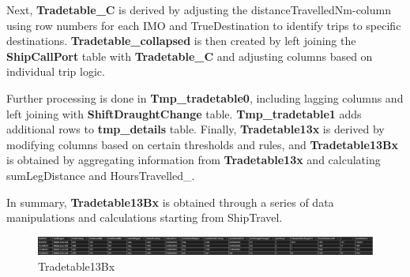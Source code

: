 Next, \textbf{Tradetable\_C} is derived by adjusting the distanceTravelledNm-column using row numbers for each IMO and TrueDestination to identify trips to specific destinations.
\newline \textbf{Tradetable\_collapsed} is then created by left joining the \textbf{ShipCallPort} table with \newline  \textbf{Tradetable\_C} and adjusting columns based on individual trip logic.

Further processing is done in \textbf{Tmp\_tradetable0}, including lagging columns and left joining with \textbf{ShiftDraughtChange} table.
\textbf{Tmp\_tradetable1} adds additional rows to \textbf{tmp\_details} table.
Finally, \textbf{Tradetable13x} is derived by modifying columns based on certain thresholds and rules, and
\textbf{Tradetable13Bx} is obtained by aggregating information from \textbf{Tradetable13x} and calculating sumLegDistance and HoursTravelled\_.

In summary, \textbf{Tradetable13Bx} is obtained through a series of data manipulations and calculations starting from ShipTravel.

\begin{figure}[h]
    \centering
    \includegraphics[width=1\textwidth]{images/tradetable13bx.png}
    \caption{Tradetable13Bx}
    \label{tradetable13bx}
\end{figure}